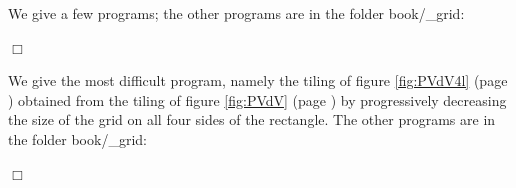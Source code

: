\clearpage
\begin{corrige}{
\renewcommand{\carrenoir}{\hspace{-4mm}\rule{1.5mm}{1.5mm}\hspace{2.5mm}}
We give a few programs; the other programs are in the folder
{\idt book/\_grid}:


\renewcommand{\carrenoir}{}
\noindent $\Box$}\end{corrige}
\begin{corrige}{
We give the most difficult program, namely the tiling of figure
\ref{fig:PVdV4l} (page \pageref{fig:PVdV4l}) obtained
from the tiling of figure \ref{fig:PVdV} (page \pageref{fig:PVdV}) by pro\-gres\-sive\-ly decreasing the size of the grid on all
four sides of the rectangle. The other programs are
in the folder {\idt book/\_grid}:

\noindent $\Box$}\end{corrige}

